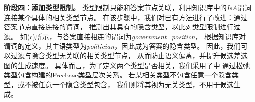 %  



\textbf{阶段四：添加类型限制。}
类型限制只能和答案节点关联，利用知识库中的\textit{IsA}谓词连接某个具体的相关类型节点。
在该步骤中，我们对已有方法进行了改进：通过答案节点直接连接的谓词，
推测出其具有的隐含类型，以此对类型限制进行过滤。
如(c)所示，与答案直接相连的谓词为\textit{government\_position}，
根据知识库对谓词的定义，其主语类型为\textit{politician}，因此成为答案的隐含类型。
因此，我们可以过滤与隐含类型无关联的相关类型节点，
从而防止语义偏离，并提升候选差选图的生成速度。
具体而言，为了定义两个类型是否相关，我们采用了中
通过松弛类型包含构建的Freebase类型层次关系。
若某相关类型不包含任意一个隐含类型，或不被任意一个隐含类型包含，
我们则将其视为无关类型，不用于候选生成。


